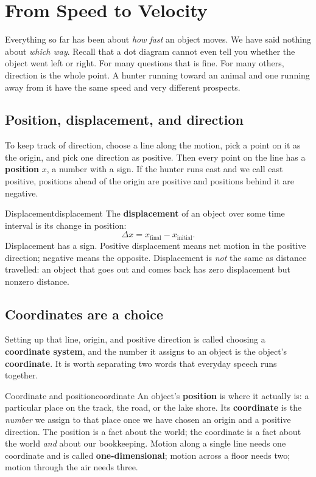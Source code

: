 \documentclass[11pt,twoside,openany]{book}
\begin{document}
\section{From Speed to Velocity}
\label{sec:velocity}

Everything so far has been about \emph{how fast} an object moves. We have said nothing about \emph{which way}. Recall that a dot diagram cannot even tell you whether the object went left or right. For many questions that is fine. For many others, direction is the whole point. A hunter running toward an animal and one running away from it have the same speed and very different prospects.

\subsection{Position, displacement, and direction}

To keep track of direction, choose a line along the motion, pick a point on it as the origin, and pick one direction as positive. Then every point on the line has a \textbf{position} $x$, a number with a sign. If the hunter runs east and we call east positive, positions ahead of the origin are positive and positions behind it are negative.

\begin{definition}{Displacement}{displacement}
The \textbf{displacement} of an object over some time interval is its change in position:
\[
\Delta x = x_{\text{final}} - x_{\text{initial}}.
\]
Displacement has a sign. Positive displacement means net motion in the positive direction; negative means the opposite. Displacement is \emph{not} the same as distance travelled: an object that goes out and comes back has zero displacement but nonzero distance.
\end{definition}

\subsection{Coordinates are a choice}
\label{sec:coords}

Setting up that line, origin, and positive direction is called choosing a \textbf{coordinate system}, and the number it assigns to an object is the object's \textbf{coordinate}. It is worth separating two words that everyday speech runs together.

\begin{definition}{Coordinate and position}{coordinate}
An object's \textbf{position} is where it actually is: a particular place on the track, the road, or the lake shore. Its \textbf{coordinate} is the \emph{number} we assign to that place once we have chosen an origin and a positive direction. The position is a fact about the world; the coordinate is a fact about the world \emph{and} about our bookkeeping. Motion along a single line needs one coordinate and is called \textbf{one-dimensional}; motion across a floor needs two; motion through the air needs three.
\end{definition}
\end{document}
